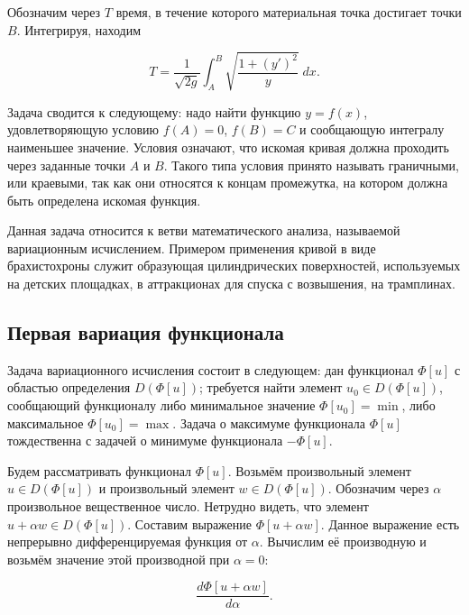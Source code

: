 \documentclass{article}
\begin{document}
\noindent Обозначим через $T$ время, в течение которого материальная точка достигает точки $B$. Интегрируя, находим

\begin{displaymath}
    T = \frac{1}{\sqrt{2g}} \int_{A}^{B} \sqrt{\frac{1 + (y')^2}{y}} \; dx.
\end{displaymath}

Задача сводится к следующему: надо найти функцию $y = f(x)$, удовлетворяющую условию $f(A) = 0$, $f(B) = C$ и сообщающую интегралу наименьшее значение. Условия означают, что искомая кривая должна проходить через заданные точки $A$ и $B$. Такого типа условия принято называть граничными, или краевыми, так как они относятся к концам промежутка, на котором должна быть определена искомая функция.

\begin{info}
	Данная задача относится к ветви математического анализа, называемой вариационным исчислением. Примером применения кривой в виде брахистохроны служит образующая цилиндрических поверхностей, используемых на детских площадках, в аттракционах для спуска с возвышения, на трамплинах.
\end{info}


\subsection{Первая вариация функционала}

Задача вариационного исчисления состоит в следующем: дан функционал $\Phi[u]$ с областью определения $D(\Phi[u])$; требуется найти элемент $u_{0} \in D(\Phi[u])$,
 сообщающий функционалу либо минимальное значение $\Phi[u_{0}] = \min$, либо максимальное $\Phi[u_{0}] = \max$. 
 Задача о максимуме функционала $\Phi[u]$ тождественна с задачей о минимуме функционала $- \Phi[u]$.

Будем рассматривать функционал $\Phi[u]$. Возьмём произвольный элемент $u \in D(\Phi[u])$ и произвольный элемент $w \in D(\Phi[u]) $.
 Обозначим через $\alpha$ произвольное вещественное число. Нетрудно видеть, что элемент $ u + \alpha w \in D(\Phi[u])$. 
 Составим выражение $\Phi[u + \alpha w]$. Данное выражение есть непрерывно дифференцируемая функция от $\alpha$. 
 Вычислим её производную и возьмём значение этой производной при $\alpha = 0$:

\begin{displaymath}
    \frac{d\Phi[u + \alpha w]}{d\alpha}.
\end{displaymath}
\end{document}
